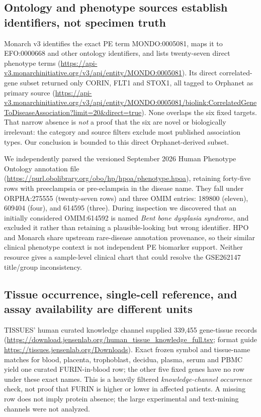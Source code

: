 \documentclass[11pt,a4paper]{article}
\begin{document}
\subsection{Ontology and phenotype sources establish identifiers, not specimen truth}
Monarch v3 identifies the exact PE term MONDO:0005081, maps it to EFO:0000668 and other ontology identifiers, and lists twenty-seven direct phenotype terms (\url{https://api-v3.monarchinitiative.org/v3/api/entity/MONDO:0005081}). Its direct correlated-gene subset returned only CORIN, FLT1 and STOX1, all tagged to Orphanet as primary source (\url{https://api-v3.monarchinitiative.org/v3/api/entity/MONDO:0005081/biolink:CorrelatedGeneToDiseaseAssociation?limit=20&direct=true}). None overlaps the six fixed targets. That narrow absence is \emph{not} a proof that the six are novel or biologically irrelevant: the category and source filters exclude most published association types. Our conclusion is bounded to this direct Orphanet-derived subset.

We independently parsed the versioned September 2026 Human Phenotype Ontology annotation file (\url{https://purl.obolibrary.org/obo/hp/hpoa/phenotype.hpoa}), retaining forty-five rows with preeclampsia or pre-eclampsia in the disease name. They fall under ORPHA:275555 (twenty-seven rows) and three OMIM entries: 189800 (eleven), 609404 (four), and 614595 (three). During inspection we discovered that an initially considered OMIM:614592 is named \emph{Bent bone dysplasia syndrome}, and excluded it rather than retaining a plausible-looking but wrong identifier. HPO and Monarch share upstream rare-disease annotation provenance, so their similar clinical phenotype context is not independent PE biomarker support. Neither resource gives a sample-level clinical chart that could resolve the GSE262147 title/group inconsistency.

\subsection{Tissue occurrence, single-cell reference, and assay availability are different units}
TISSUES' human curated knowledge channel supplied 339,455 gene-tissue records (\url{https://download.jensenlab.org/human_tissue_knowledge_full.tsv}; format guide \url{https://tissues.jensenlab.org/Downloads}). Exact frozen symbol and tissue-name matches for blood, placenta, trophoblast, decidua, plasma, serum and PBMC yield one curated FURIN-in-blood row; the other five fixed genes have no row under these exact names. This is a heavily filtered \emph{knowledge-channel occurrence} check, not proof that FURIN is higher or lower in affected patients. A missing row does not imply protein absence; the large experimental and text-mining channels were not analyzed.
\end{document}
